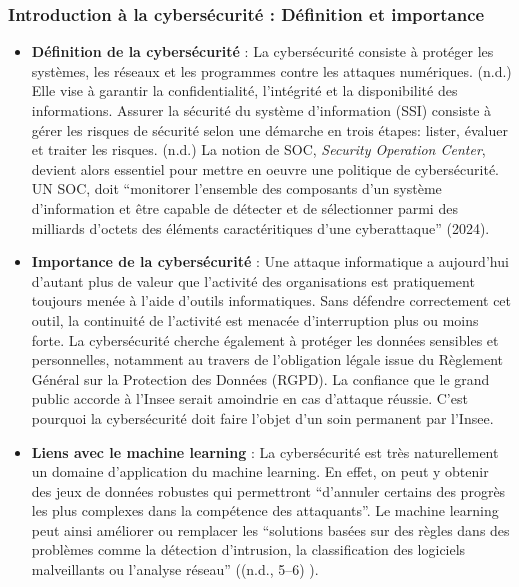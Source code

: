 \documentclass[
  letterpaper,
  DIV=11,
  numbers=noendperiod]{scrartcl}
\begin{document}
\subsubsection{Introduction à la cybersécurité : Définition et
importance}\label{introduction-uxe0-la-cybersuxe9curituxe9-duxe9finition-et-importance}

\begin{itemize}
\item
  \textbf{Définition de la cybersécurité} : La cybersécurité consiste à
  protéger les systèmes, les réseaux et les programmes contre les
  attaques numériques. (n.d.) Elle vise à garantir la confidentialité,
  l'intégrité et la disponibilité des informations. Assurer la sécurité
  du système d'information (SSI) consiste à gérer les risques de
  sécurité selon une démarche en trois étapes: lister, évaluer et
  traiter les risques. (n.d.) La notion de SOC, \emph{Security Operation
  Center}, devient alors essentiel pour mettre en oeuvre une politique
  de cybersécurité. UN SOC, doit ``monitorer l'ensemble des composants
  d'un système d'information et être capable de détecter et de
  sélectionner parmi des milliards d'octets des éléments caractéritiques
  d'une cyberattaque'' (2024).
\item
  \textbf{Importance de la cybersécurité} : Une attaque informatique a
  aujourd'hui d'autant plus de valeur que l'activité des organisations
  est pratiquement toujours menée à l'aide d'outils informatiques. Sans
  défendre correctement cet outil, la continuité de l'activité est
  menacée d'interruption plus ou moins forte. La cybersécurité cherche
  également à protéger les données sensibles et personnelles, notamment
  au travers de l'obligation légale issue du Règlement Général sur la
  Protection des Données (RGPD). La confiance que le grand public
  accorde à l'Insee serait amoindrie en cas d'attaque réussie. C'est
  pourquoi la cybersécurité doit faire l'objet d'un soin permanent par
  l'Insee.
\item
  \textbf{Liens avec le machine learning} : La cybersécurité est très
  naturellement un domaine d'application du machine learning. En effet,
  on peut y obtenir des jeux de données robustes qui permettront
  ``d'annuler certains des progrès les plus complexes dans la compétence
  des attaquants''. Le machine learning peut ainsi améliorer ou
  remplacer les ``solutions basées sur des règles dans des problèmes
  comme la détection d'intrusion, la classification des logiciels
  malveillants ou l'analyse réseau'' ((n.d., 5--6) ).
\end{itemize}
\end{document}
